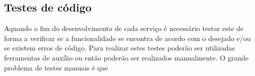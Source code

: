 \subsection{Testes de código}
Aquando o fim do desenvolvimento de cada serviço é necessário testar este de forma a verificar se a funcionalidade se encontra de acordo com o desejado e/ou se existem erros de código. Para realizar estes testes poderão ser utilizadas ferramentas de auxílio ou então poderão ser realizados manualmente. O grande problema de testes manuais é que 